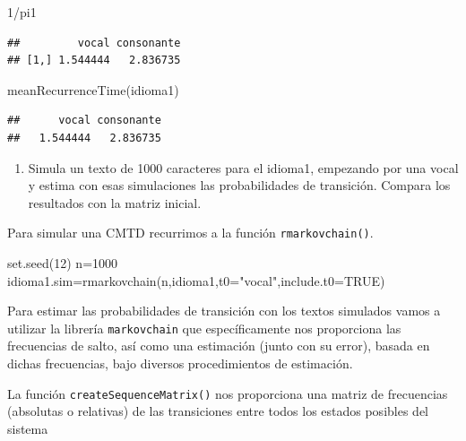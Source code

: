 \documentclass[
]{book}
\newenvironment{Shaded}{\begin{snugshade}}{\end{snugshade}}
\newcommand{\AttributeTok}[1]{\textcolor[rgb]{0.77,0.63,0.00}{#1}}
\newcommand{\ConstantTok}[1]{\textcolor[rgb]{0.00,0.00,0.00}{#1}}
\newcommand{\DecValTok}[1]{\textcolor[rgb]{0.00,0.00,0.81}{#1}}
\newcommand{\FunctionTok}[1]{\textcolor[rgb]{0.00,0.00,0.00}{#1}}
\newcommand{\NormalTok}[1]{#1}
\newcommand{\OtherTok}[1]{\textcolor[rgb]{0.56,0.35,0.01}{#1}}
\newcommand{\SpecialCharTok}[1]{\textcolor[rgb]{0.00,0.00,0.00}{#1}}
\newcommand{\StringTok}[1]{\textcolor[rgb]{0.31,0.60,0.02}{#1}}
\providecommand{\tightlist}{%
  \setlength{\itemsep}{0pt}\setlength{\parskip}{0pt}}
\theoremstyle{definition}
\theoremstyle{definition}
\theoremstyle{definition}
\theoremstyle{definition}
\theoremstyle{remark}
\begin{document}
\begin{Shaded}
\begin{Highlighting}[]
\DecValTok{1}\SpecialCharTok{/}\NormalTok{pi1}
\end{Highlighting}
\end{Shaded}

\begin{verbatim}
##         vocal consonante
## [1,] 1.544444   2.836735
\end{verbatim}

\begin{Shaded}
\begin{Highlighting}[]
\FunctionTok{meanRecurrenceTime}\NormalTok{(idioma1)}
\end{Highlighting}
\end{Shaded}

\begin{verbatim}
##      vocal consonante 
##   1.544444   2.836735
\end{verbatim}

\begin{enumerate}
\def\labelenumi{\arabic{enumi}.}
\setcounter{enumi}{7}
\tightlist
\item
  Simula un texto de 1000 caracteres para el idioma1, empezando por una vocal y estima con esas simulaciones las probabilidades de transición. Compara los resultados con la matriz inicial.
\end{enumerate}

Para simular una CMTD recurrimos a la función \texttt{rmarkovchain()}.

\begin{Shaded}
\begin{Highlighting}[]
\FunctionTok{set.seed}\NormalTok{(}\DecValTok{12}\NormalTok{)}
\NormalTok{n}\OtherTok{=}\DecValTok{1000}
\NormalTok{idioma1.sim}\OtherTok{=}\FunctionTok{rmarkovchain}\NormalTok{(n,idioma1,}\AttributeTok{t0=}\StringTok{"vocal"}\NormalTok{,}\AttributeTok{include.t0=}\ConstantTok{TRUE}\NormalTok{)}
\end{Highlighting}
\end{Shaded}

Para estimar las probabilidades de transición con los textos simulados vamos a utilizar la librería \texttt{markovchain} que específicamente nos proporciona las frecuencias de salto, así como una estimación (junto con su error), basada en dichas frecuencias, bajo diversos procedimientos de estimación.

La función \texttt{createSequenceMatrix()} nos proporciona una matriz de frecuencias (absolutas o relativas) de las transiciones entre todos los estados posibles del sistema
\end{document}
